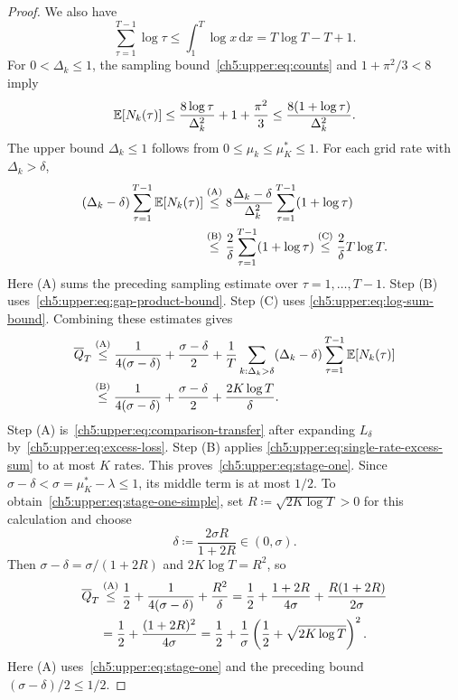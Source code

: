 \begin{proof}
We also have
\begin{equation}
 \sum_{\tau=1}^{T-1}\log\tau
 \le\int_1^T\log x\,\mathrm dx=T\log T-T+1.
 \label{ch5:upper:eq:log-sum-bound}
\end{equation}
For $0<\Delta_k\le1$, the sampling bound~\eqref{ch5:upper:eq:counts}
and $1+\pi^2/3<8$ imply
\[
 \mathbb{E}[N_k(\tau)]
 \le\frac{8\log\tau}{\Delta_k^2}+1+\frac{\pi^2}{3}
 \le\frac{8(1+\log\tau)}{\Delta_k^2}.
\]
The upper bound $\Delta_k\le1$ follows from
$0\le\mu_k\le\mu_K^*\le1$. For each grid rate with $\Delta_k>\delta$,
\begin{equation}
\begin{aligned}
(\Delta_k-\delta)\sum_{\tau=1}^{T-1}\mathbb{E}[N_k(\tau)]
 &\overset{\mathrm{(A)}}{\le}
 8\frac{\Delta_k-\delta}{\Delta_k^2}
 \sum_{\tau=1}^{T-1}(1+\log\tau)\\
 &\overset{\mathrm{(B)}}{\le}\frac2\delta
 \sum_{\tau=1}^{T-1}(1+\log\tau)
 \overset{\mathrm{(C)}}{\le}\frac2\delta T\log T.
\end{aligned}
\label{ch5:upper:eq:single-rate-excess-sum}
\end{equation}
Here (A) sums the preceding sampling estimate over $\tau=1,\ldots,T-1$.
Step (B) uses~\eqref{ch5:upper:eq:gap-product-bound}. Step (C) uses
\eqref{ch5:upper:eq:log-sum-bound}.
Combining these estimates gives
\begin{align*}
\overline Q_T
&\overset{\mathrm{(A)}}{\le}\frac{1}{4(\sigma-\delta)}+\frac{\sigma-\delta}{2}
+\frac1T\sum_{k:\Delta_k>\delta}
(\Delta_k-\delta)\sum_{\tau=1}^{T-1}\mathbb{E}[N_k(\tau)]\\
&\overset{\mathrm{(B)}}{\le}\frac{1}{4(\sigma-\delta)}+\frac{\sigma-\delta}{2}
+\frac{2K\log T}{\delta}.
\end{align*}
Step (A) is~\eqref{ch5:upper:eq:comparison-transfer} after expanding
$L_\delta$ by~\eqref{ch5:upper:eq:excess-loss}. Step (B) applies
\eqref{ch5:upper:eq:single-rate-excess-sum} to at most $K$ rates.
This proves~\eqref{ch5:upper:eq:stage-one}. Since
$\sigma-\delta<\sigma=\mu_K^*-\lambda\le1$, its middle term is at most $1/2$.
To obtain~\eqref{ch5:upper:eq:stage-one-simple}, set
$R\coloneqq\sqrt{2K\log T}>0$ for this calculation and choose
\[
\delta\coloneqq\frac{2\sigma R}{1+2R}\in(0,\sigma).
\]
Then $\sigma-\delta=\sigma/(1+2R)$ and $2K\log T=R^2$, so
\begin{align}
\overline Q_T
 &\overset{\mathrm{(A)}}{\le}\frac12+\frac{1}{4(\sigma-\delta)}
   +\frac{R^2}{\delta}
=\frac12+\frac{1+2R}{4\sigma}
   +\frac{R(1+2R)}{2\sigma}\notag\\
&=\frac12+\frac{(1+2R)^2}{4\sigma}
=\frac12+\frac1\sigma
   \left(\frac12+\sqrt{2K\log T}\right)^2.
\label{ch5:upper:eq:combination-comparison}
\end{align}
Here (A) uses~\eqref{ch5:upper:eq:stage-one} and the preceding bound
$(\sigma-\delta)/2\le1/2$.
\end{proof}

